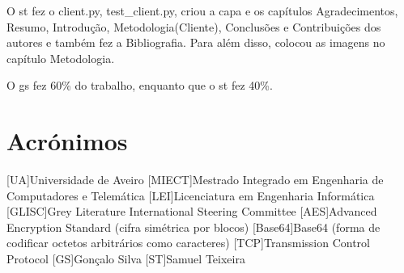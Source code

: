 \documentclass{report}
\begin{document}
O \ac{st} fez o client.py, test\_client.py, criou a capa e os capítulos Agradecimentos, Resumo, Introdução, Metodologia(Cliente), Conclusões e Contribuições dos autores e também fez a Bibliografia. Para além disso, colocou as imagens no capítulo Metodologia.

O \ac{gs} fez 60\% do trabalho, enquanto que o \ac{st} fez 40\%.
\chapter*{Acrónimos}
\begin{acronym}
[UA]{Universidade de Aveiro}
[MIECT]{Mestrado Integrado em Engenharia de Computadores e Telemática}
[LEI]{Licenciatura em Engenharia Informática}
[GLISC]{Grey Literature International Steering Committee}
[AES]{Advanced Encryption Standard (cifra simétrica por blocos)}
[Base64]{Base64 (forma de codificar octetos arbitrários como caracteres)}
[TCP]{Transmission Control Protocol}
[GS]{Gonçalo Silva}
[ST]{Samuel Teixeira}
\end{acronym}

\printbibliography
\end{document}

